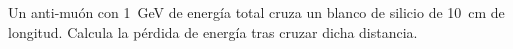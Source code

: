 \documentclass[./../main.tex]{subfiles}
\begin{document}
    \begin{exercise}
        Un anti-muón con \qty{1}{\GeV} de energía total cruza un blanco de silicio de \qty{10}{\cm} de longitud. Calcula la pérdida de energía tras cruzar dicha distancia.
    \end{exercise}
\end{document}
